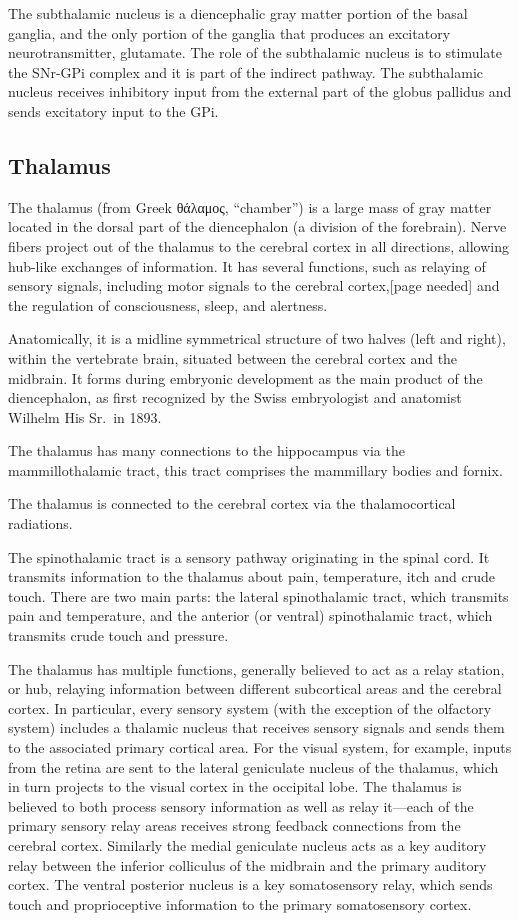 \documentclass[]{book}
\begin{document}
The subthalamic nucleus is a diencephalic gray matter portion of the basal ganglia, and the only portion of the ganglia that produces an excitatory neurotransmitter, glutamate. The role of the subthalamic nucleus is to stimulate the SNr-GPi complex and it is part of the indirect pathway. The subthalamic nucleus receives inhibitory input from the external part of the globus pallidus and sends excitatory input to the GPi.

\hypertarget{thalamus}{%
\subsection{Thalamus}\label{thalamus}}

The thalamus (from Greek θάλαμος, ``chamber'') is a large mass of gray matter located in the dorsal part of the diencephalon (a division of the forebrain). Nerve fibers project out of the thalamus to the cerebral cortex in all directions, allowing hub-like exchanges of information. It has several functions, such as relaying of sensory signals, including motor signals to the cerebral cortex,{[}page needed{]} and the regulation of consciousness, sleep, and alertness.

Anatomically, it is a midline symmetrical structure of two halves (left and right), within the vertebrate brain, situated between the cerebral cortex and the midbrain. It forms during embryonic development as the main product of the diencephalon, as first recognized by the Swiss embryologist and anatomist Wilhelm His Sr.~in 1893.

The thalamus has many connections to the hippocampus via the mammillothalamic tract, this tract comprises the mammillary bodies and fornix.

The thalamus is connected to the cerebral cortex via the thalamocortical radiations.

The spinothalamic tract is a sensory pathway originating in the spinal cord. It transmits information to the thalamus about pain, temperature, itch and crude touch. There are two main parts: the lateral spinothalamic tract, which transmits pain and temperature, and the anterior (or ventral) spinothalamic tract, which transmits crude touch and pressure.

The thalamus has multiple functions, generally believed to act as a relay station, or hub, relaying information between different subcortical areas and the cerebral cortex. In particular, every sensory system (with the exception of the olfactory system) includes a thalamic nucleus that receives sensory signals and sends them to the associated primary cortical area. For the visual system, for example, inputs from the retina are sent to the lateral geniculate nucleus of the thalamus, which in turn projects to the visual cortex in the occipital lobe. The thalamus is believed to both process sensory information as well as relay it---each of the primary sensory relay areas receives strong feedback connections from the cerebral cortex. Similarly the medial geniculate nucleus acts as a key auditory relay between the inferior colliculus of the midbrain and the primary auditory cortex. The ventral posterior nucleus is a key somatosensory relay, which sends touch and proprioceptive information to the primary somatosensory cortex.
\end{document}

